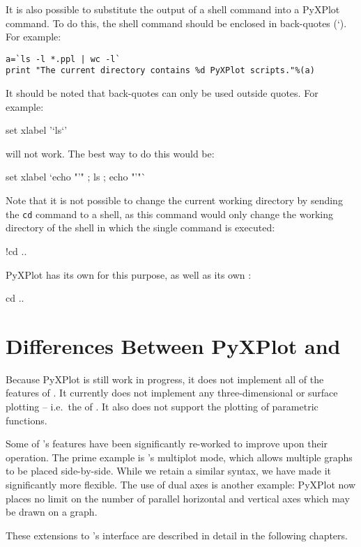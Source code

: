 It is also possible to substitute the output of a shell command into a PyXPlot
command. To do this, the shell command should be enclosed in back-quotes (`).
For example:

\begin{verbatim}
a=`ls -l *.ppl | wc -l`
print "The current directory contains %d PyXPlot scripts."%(a)
\end{verbatim}

It should be noted that back-quotes can only be used outside quotes. For
example:

\begin{dontdo}
set xlabel '`ls`'
\end{dontdo}

\noindent will not work. The best way to do this would be:

\begin{dodo}
set xlabel `echo "'" ; ls ; echo "'"`
\end{dodo}

Note that it is not possible to change the current working directory by sending
the {\tt cd} command to a shell, as this command would only change the working
directory of the shell in which the single command is executed:

\begin{dontdo}
!cd ..
\end{dontdo}

PyXPlot has its own  for this purpose, as well as its own
:

\begin{dodo}
cd ..
\end{dodo}

\section{Differences Between PyXPlot and \gnuplot}
\label{missing_features}

Because PyXPlot is still work in progress, it does not implement all of the
features of \gnuplot. It currently does not implement any three-dimensional or
surface plotting -- i.e.\ the  of \gnuplot. It also does not
support the plotting of parametric functions.

Some of \gnuplot's features have been significantly re-worked to improve upon
their operation. The prime example is \gnuplot's multiplot mode, which allows
multiple graphs to be placed side-by-side. While we retain a similar syntax, we
have made it significantly more flexible. The use of dual axes is another
example: PyXPlot now places no limit on the number of parallel horizontal and
vertical axes which may be drawn on a graph.

These extensions to \gnuplot's interface are described in detail in the
following chapters.
